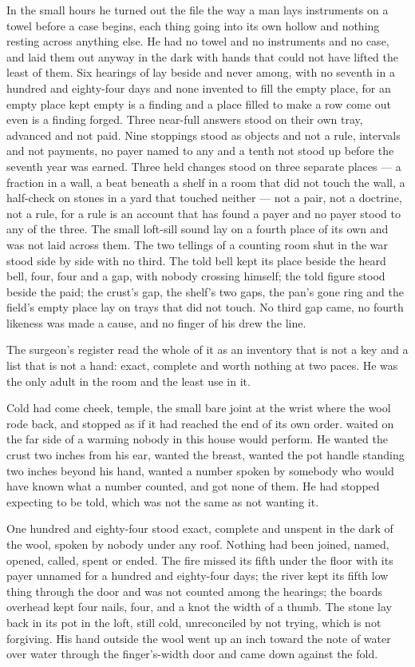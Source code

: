\scenebreak

In the small hours he turned out the file the way a man lays instruments on a towel before a case begins, each thing going into its own hollow and nothing resting across anything else. He had no towel and no instruments and no case, and laid them out anyway in the dark with hands that could not have lifted the least of them. Six hearings of  lay beside and never among, with no seventh in a hundred and eighty-four days and none invented to fill the empty place, for an empty place kept empty is a finding and a place filled to make a row come out even is a finding forged. Three near-full answers stood on their own tray, advanced and not paid. Nine stoppings stood as objects and not a rule, intervals and not payments, no payer named to any and a tenth not stood up before the seventh year was earned. Three held changes stood on three separate places --- a fraction in a wall, a beat beneath a shelf in a room that did not touch the wall, a half-check on stones in a yard that touched neither --- not a pair, not a doctrine, not a rule, for a rule is an account that has found a payer and no payer stood to any of the three. The small loft-sill sound lay on a fourth place of its own and was not laid across them. The two tellings of a counting room shut in the war stood side by side with no third. The told bell kept its place beside the heard bell, four, four and a gap, with nobody crossing himself; the told figure stood beside the paid; the crust's gap, the shelf's two gaps, the pan's gone ring and the field's empty place lay on trays that did not touch. No third gap came, no fourth likeness was made a cause, and no finger of his drew the line.

The surgeon's register read the whole of it as an inventory that is not a key and a list that is not a hand: exact, complete and worth nothing at two paces. He was the only adult in the room and the least use in it.

Cold had come cheek, temple, the small bare joint at the wrist where the wool rode back, and stopped as if it had reached the end of its own order.  waited on the far side of a warming nobody in this house would perform. He wanted the crust two inches from his ear, wanted the breast, wanted the pot handle standing two inches beyond his hand, wanted a number spoken by somebody who would have known what a number counted, and got none of them. He had stopped expecting to be told, which was not the same as not wanting it.

One hundred and eighty-four stood exact, complete and unspent in the dark of the wool, spoken by nobody under any roof. Nothing had been joined, named, opened, called, spent or ended. The fire missed its fifth under the floor with its payer unnamed for a hundred and eighty-four days; the river kept its fifth low thing through the door and was not counted among the hearings; the boards overhead kept four nails, four, and a knot the width of a thumb. The stone lay back in its pot in the loft, still cold, unreconciled by not trying, which is not forgiving. His hand outside the wool went up an inch toward the note of water over water through the finger's-width door and came down against the fold.
